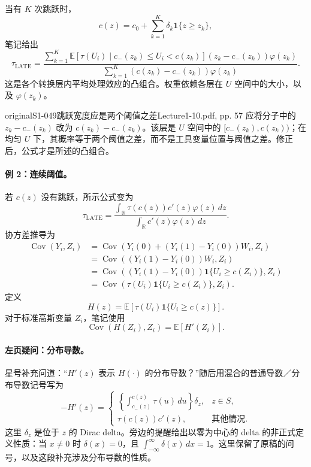 当有 $K$ 次跳跃时，
\[
 c(z)=c_0+\sum_{k=1}^K\delta_k\mathbf1\{z\ge z_k\},
\]
笔记给出
\[
 \tau_{\mathrm{LATE}}=
 \frac{\displaystyle\sum_{k=1}^K
 \mathbb E[\tau(U_i)\mid c_-(z_k)\le U_i<c(z_k)]
 (z_k-c_-(z_k))\varphi(z_k)}
 {\displaystyle\sum_{k=1}^K(c(z_k)-c_-(z_k))\varphi(z_k)}.
\]
这是各个转换层内平均处理效应的凸组合。权重依赖各层在 $U$ 空间中的大小，以及 $\varphi(z_k)$。
\begin{reviewnote}{original}{S1-049}{跳跃宽度应是两个阈值之差}{Lecture1-10.pdf, pp. 57}
应将分子中的 $z_k-c_-(z_k)$ 改为 $c(z_k)-c_-(z_k)$。该层是 $U$ 空间中的 $[c_-(z_k),c(z_k))$；在均匀 $U$ 下，其概率等于两个阈值之差，而不是工具变量位置与阈值之差。修正后，公式才是所述的凸组合。
\end{reviewnote}



\paragraph{例 2：连续阈值。}
若 $c(z)$ 没有跳跃，所示公式变为
\[
 \tau_{\mathrm{LATE}}=
 \frac{\displaystyle\int_{\mathbb R}\tau(c(z))c'(z)\varphi(z)\,dz}
 {\displaystyle\int_{\mathbb R}c'(z)\varphi(z)\,dz}.
\]
协方差推导为
\begin{align*}
 \operatorname{Cov}(Y_i,Z_i)
 &=\operatorname{Cov}(Y_i(0)+(Y_i(1)-Y_i(0))W_i,Z_i)\\
 &=\operatorname{Cov}((Y_i(1)-Y_i(0))W_i,Z_i)\\
 &=\operatorname{Cov}((Y_i(1)-Y_i(0))\mathbf1\{U_i\ge c(Z_i)\},Z_i)\\
 &=\operatorname{Cov}(\tau(U_i)\mathbf1\{U_i\ge c(Z_i)\},Z_i).
\end{align*}
定义
\[
 H(z)=\mathbb E[\tau(U_i)\mathbf1\{U_i\ge c(z)\}].
\]
对于标准高斯变量 $Z_i$，笔记使用
\[
 \operatorname{Cov}(H(Z_i),Z_i)=\mathbb E[H'(Z_i)].
\]

\paragraph{左页疑问：分布导数。}
星号补充问道：“$H'(z)$ 表示 $H(\cdot)$ 的分布导数？”随后用混合的普通导数／分布导数记号写为
\[
 -H'(z)=
 \begin{cases}
 \displaystyle\left\{\int_{c_-(z)}^{c(z)}\tau(u)\,du\right\}\delta_z,
 &z\in S,\\
 \tau(c(z))c'(z),&\text{其他情况}.
 \end{cases}
\]
这里 $\delta_z$ 是位于 $z$ 的 Dirac delta。旁边的提醒给出以零为中心的 delta 的非正式定义性质：当 $x\ne0$ 时 $\delta(x)=0$，且 $\int_{-\infty}^{\infty}\delta(x)\,dx=1$。这里保留了原稿的问号，以及这段补充涉及分布导数的性质。

